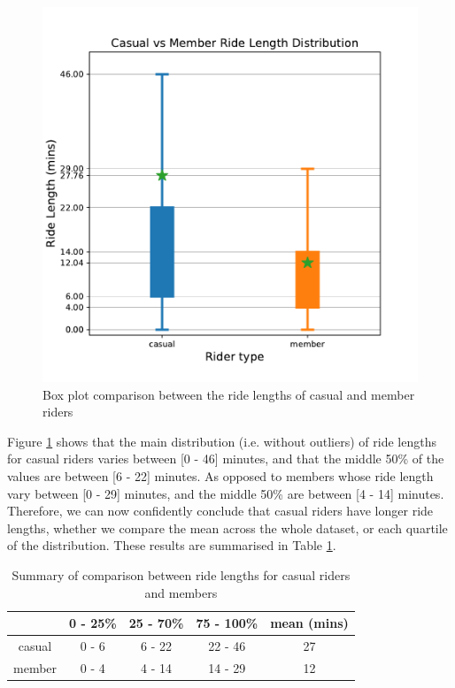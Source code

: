 \documentclass[12pt]{article}
\begin{document}
\begin{itemize}
	\begin{figure}[h]
	\centering
	\includegraphics[scale=0.5]{boxplot_distribution2.pdf} 
	\caption{Box plot comparison between the ride lengths of casual and member riders}
	\label{fig15}
	\end{figure}
\pagebreak
Figure \ref{fig15} shows that the main distribution (i.e. without outliers) of ride lengths for casual riders varies between [0 - 46] minutes, and that the middle 50\% of the values are between [6 - 22] minutes. As opposed to members whose ride length vary between [0 - 29] minutes, and the middle 50\% are between [4 - 14] minutes. Therefore, we can now confidently conclude that casual riders have longer ride lengths, whether we compare the mean across the whole dataset, or each quartile of the distribution. These results are summarised in Table \ref{table1}.

\begin{table}[h]
\begin{center}
\begin{tabular}{ | c | c | c| c | c |  } 
\hline
   	& 0 - 25\% 	& 25 - 70\% 	& 75 - 100\% &  mean (mins)  \\ 
  \hline
casual 	& 0 - 6 		&  6 - 22 		& 22 - 46 & 27 \\
\hline
member 	& 0 - 4 		& 4 - 14		& 14 - 29 & 12 \\
\hline
\end{tabular}
\caption{Summary of comparison between ride lengths for casual riders and members }
\label{table1}
\end{center} 
\end{table}
	

\end{itemize}
\end{document}
